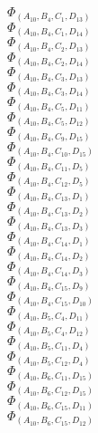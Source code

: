 \documentclass[14pt]{article}
\begin{document}
    $\Phi_{({A}_{10}, {B}_{4}, {C}_{1}, {D}_{13})}$ \\ 
    $\Phi_{({A}_{10}, {B}_{4}, {C}_{1}, {D}_{14})}$ \\ 
    $\Phi_{({A}_{10}, {B}_{4}, {C}_{2}, {D}_{13})}$ \\ 
    $\Phi_{({A}_{10}, {B}_{4}, {C}_{2}, {D}_{14})}$ \\ 
    $\Phi_{({A}_{10}, {B}_{4}, {C}_{3}, {D}_{13})}$ \\ 
    $\Phi_{({A}_{10}, {B}_{4}, {C}_{3}, {D}_{14})}$ \\ 
    $\Phi_{({A}_{10}, {B}_{4}, {C}_{5}, {D}_{11})}$ \\ 
    $\Phi_{({A}_{10}, {B}_{4}, {C}_{5}, {D}_{12})}$ \\ 
    $\Phi_{({A}_{10}, {B}_{4}, {C}_{9}, {D}_{15})}$ \\ 
    $\Phi_{({A}_{10}, {B}_{4}, {C}_{10}, {D}_{15})}$ \\ 
    $\Phi_{({A}_{10}, {B}_{4}, {C}_{11}, {D}_{5})}$ \\ 
    $\Phi_{({A}_{10}, {B}_{4}, {C}_{12}, {D}_{5})}$ \\ 
    $\Phi_{({A}_{10}, {B}_{4}, {C}_{13}, {D}_{1})}$ \\ 
    $\Phi_{({A}_{10}, {B}_{4}, {C}_{13}, {D}_{2})}$ \\ 
    $\Phi_{({A}_{10}, {B}_{4}, {C}_{13}, {D}_{3})}$ \\ 
    $\Phi_{({A}_{10}, {B}_{4}, {C}_{14}, {D}_{1})}$ \\ 
    $\Phi_{({A}_{10}, {B}_{4}, {C}_{14}, {D}_{2})}$ \\ 
    $\Phi_{({A}_{10}, {B}_{4}, {C}_{14}, {D}_{3})}$ \\ 
    $\Phi_{({A}_{10}, {B}_{4}, {C}_{15}, {D}_{9})}$ \\ 
    $\Phi_{({A}_{10}, {B}_{4}, {C}_{15}, {D}_{10})}$ \\ 
    $\Phi_{({A}_{10}, {B}_{5}, {C}_{4}, {D}_{11})}$ \\ 
    $\Phi_{({A}_{10}, {B}_{5}, {C}_{4}, {D}_{12})}$ \\ 
    $\Phi_{({A}_{10}, {B}_{5}, {C}_{11}, {D}_{4})}$ \\ 
    $\Phi_{({A}_{10}, {B}_{5}, {C}_{12}, {D}_{4})}$ \\ 
    $\Phi_{({A}_{10}, {B}_{6}, {C}_{11}, {D}_{15})}$ \\ 
    $\Phi_{({A}_{10}, {B}_{6}, {C}_{12}, {D}_{15})}$ \\ 
    $\Phi_{({A}_{10}, {B}_{6}, {C}_{15}, {D}_{11})}$ \\ 
    $\Phi_{({A}_{10}, {B}_{6}, {C}_{15}, {D}_{12})}$ \\ 
\end{document}
